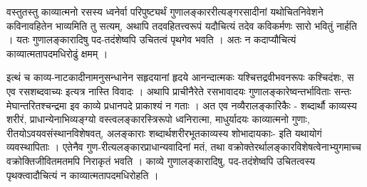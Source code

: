 {वस्तुतस्तु काव्यात्मनो रसस्य ध्वनेर्वा परिपुष्ट्यर्थं गुणालङ्काररीत्यङ्गरसादीनां यथोचितनिवेशने कविनावहितेन भाव्यमिति तु सत्यम्, अथापि तदवहितत्त्वरूपं यदौचित्यं तदेव कविकर्मणः सारो भवितुं नार्हति । यतः गुणालङ्कारादिषु पद-तदंशेष्वपि उचितत्वं पृथगेव भवति । अतः न कदाप्यौचित्यं काव्यात्मतापदमधिरोढुं क्षमम् ।

इत्थं च काव्य-नाटकादीनामनुसन्धानेन सहृदयानां हृदये आनन्दात्मकः यश्चित्तद्रवीभवनरूपः कश्चिदंशः, स एव रसशब्दवाच्यः इत्यत्र नास्ति विवादः । अथापि प्राचीनैरेते  रसभावादयः गुणालङ्कारेष्वन्तर्भाविताः सन्तः मेघान्तरितश्चन्द्रमा  इव काव्ये प्रधानपदे प्राकाश्यं न गताः । अत एव नव्यैरालङ्कारिकैः  - शब्दार्थौ काव्यस्य शरीरं, प्राधान्येनाभिव्यङ्ग्यो वस्त्वलङ्कारस्त्रिरूपो ध्वनिरात्मा, माधुर्यादयः काव्यात्मनो गुणाः, रीतयोऽवयवसंस्थानविशेषवत्, अलङ्काराः शब्दार्थशरीरभूतकाव्यस्य शोभादायकाः- इति यथायोगं व्यवस्थापिताः । एतेनैव गुण-रीत्यलङ्कारप्राधान्यवादिनां मतं, तथा वक्रोक्तेरर्थालङ्कारविशेषत्वेनाभ्युगमाच्च वक्रोक्तिजीवितमतमपि निराकृतं भवति । काव्ये गुणालङ्कारादिषु, पद-तदंशेष्वपि उचितत्वस्य पृथक्त्वादौचित्यं न काव्यात्मतापदमधिरोहति ।

\articleend
}
